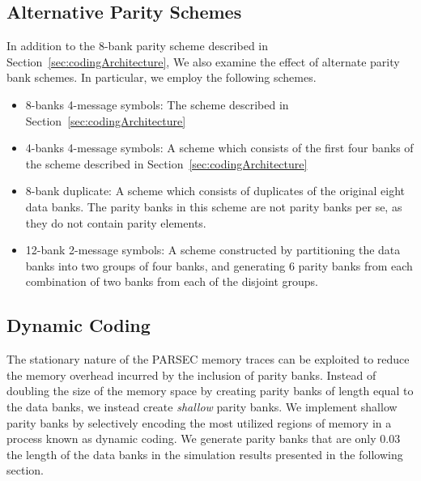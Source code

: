 \subsection{Alternative Parity Schemes}
In addition to the 8-bank parity scheme described in Section~\ref{sec:codingArchitecture}, We also examine the effect of alternate parity bank schemes. In particular, we employ the following schemes.
\begin{itemize}
	\item 8-banks 4-message symbols: The scheme described in Section~\ref{sec:codingArchitecture}
	\item 4-banks 4-message symbols: A scheme which consists of the first four banks of the scheme described in Section~\ref{sec:codingArchitecture} 
	\item 8-bank duplicate: A scheme which consists of duplicates of the original eight data banks. The parity banks in this scheme are not parity banks per se, as they do not contain parity elements.
	\item 12-bank 2-message symbols: A scheme constructed by partitioning the data banks into two groups of four banks, and generating 6 parity banks from each combination of two banks from each of the disjoint groups.
\end{itemize}

\subsection{Dynamic Coding}
The stationary nature of the PARSEC memory traces can be exploited to reduce the memory overhead incurred by the inclusion of parity banks. Instead of doubling the size of the memory space by creating parity banks of length equal to the data banks, we  instead create \textit{shallow} parity banks. We implement shallow parity banks by selectively encoding the most utilized regions of memory in a process known as dynamic coding.  We generate parity banks that are only $0.03$ the length of the data banks in the simulation results presented in the following section.

